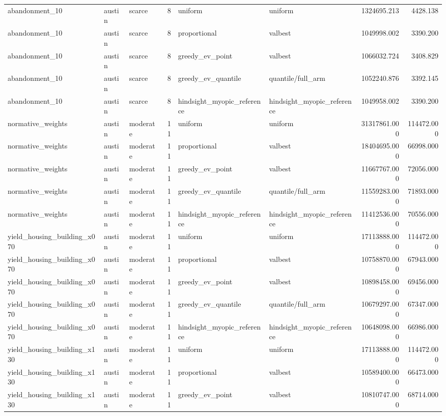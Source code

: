 \begin{tabular}{lllrllrr}
abandonment\_10 & austin & scarce & 8 & uniform & uniform & 1324695.213 & 4428.138 \\
abandonment\_10 & austin & scarce & 8 & proportional & valbest & 1049998.002 & 3390.200 \\
abandonment\_10 & austin & scarce & 8 & greedy\_ev\_point & valbest & 1066032.724 & 3408.829 \\
abandonment\_10 & austin & scarce & 8 & greedy\_ev\_quantile & quantile/full\_arm & 1052240.876 & 3392.145 \\
abandonment\_10 & austin & scarce & 8 & hindsight\_myopic\_reference & hindsight\_myopic\_reference & 1049958.002 & 3390.200 \\
normative\_weights & austin & moderate & 11 & uniform & uniform & 31317861.000 & 114472.000 \\
normative\_weights & austin & moderate & 11 & proportional & valbest & 18404695.000 & 66998.000 \\
normative\_weights & austin & moderate & 11 & greedy\_ev\_point & valbest & 11667767.000 & 72056.000 \\
normative\_weights & austin & moderate & 11 & greedy\_ev\_quantile & quantile/full\_arm & 11559283.000 & 71893.000 \\
normative\_weights & austin & moderate & 11 & hindsight\_myopic\_reference & hindsight\_myopic\_reference & 11412536.000 & 70556.000 \\
yield\_housing\_building\_x070 & austin & moderate & 11 & uniform & uniform & 17113888.000 & 114472.000 \\
yield\_housing\_building\_x070 & austin & moderate & 11 & proportional & valbest & 10758870.000 & 67943.000 \\
yield\_housing\_building\_x070 & austin & moderate & 11 & greedy\_ev\_point & valbest & 10898458.000 & 69456.000 \\
yield\_housing\_building\_x070 & austin & moderate & 11 & greedy\_ev\_quantile & quantile/full\_arm & 10679297.000 & 67347.000 \\
yield\_housing\_building\_x070 & austin & moderate & 11 & hindsight\_myopic\_reference & hindsight\_myopic\_reference & 10648098.000 & 66986.000 \\
yield\_housing\_building\_x130 & austin & moderate & 11 & uniform & uniform & 17113888.000 & 114472.000 \\
yield\_housing\_building\_x130 & austin & moderate & 11 & proportional & valbest & 10589400.000 & 66473.000 \\
yield\_housing\_building\_x130 & austin & moderate & 11 & greedy\_ev\_point & valbest & 10810747.000 & 68714.000 \\

\end{tabular}
